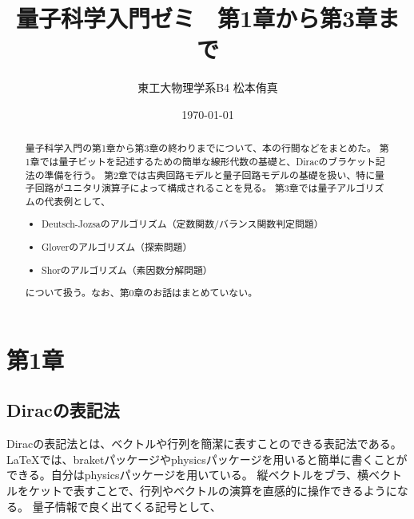 \documentclass[a4paper,11pt,uplatex]{jsarticle}%
\title{量子科学入門ゼミ　第1章から第3章まで}
\author{東工大物理学系B4 松本侑真}
\date{\today}
\begin{document}
\maketitle
\begin{abstract}
  量子科学入門の第1章から第3章の終わりまでについて、本の行間などをまとめた。
  第1章では量子ビットを記述するための簡単な線形代数の基礎と、Diracのブラケット記法の準備を行う。
  第2章では古典回路モデルと量子回路モデルの基礎を扱い、特に量子回路がユニタリ演算子によって構成されることを見る。
  第3章では量子アルゴリズムの代表例として、
  \begin{itemize}
    \item Deutsch-Jozsaのアルゴリズム（定数関数/バランス関数判定問題）
    \item Gloverのアルゴリズム（探索問題）
    \item Shorのアルゴリズム（素因数分解問題）
  \end{itemize}
  について扱う。なお、第0章のお話はまとめていない。
\end{abstract}
\tableofcontents
\newpage

\section{第1章}

\subsection{Diracの表記法}
Diracの表記法とは、ベクトルや行列を簡潔に表すことのできる表記法である。
{\LaTeX}では、braketパッケージやphysicsパッケージを用いると簡単に書くことができる。自分はphysicsパッケージを用いている。
縦ベクトルをブラ、横ベクトルをケットで表すことで、行列やベクトルの演算を直感的に操作できるようになる。
量子情報で良く出てくる記号として、
\end{document}
